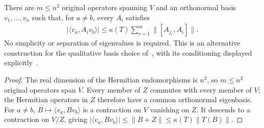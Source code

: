 \begin{lemma}
    \label{thm:hastings05_constructed_ground_basis}
    \leanok
    There are $m\le n^2$ original operators spanning $V$ and an orthonormal
    basis $v_1,\dots,v_n$ such that, for $a\ne b$, every $A_i$ satisfies
    \begin{align*}
        |\langle v_a,A_iv_b\rangle|
        \le\kappa(T)\sum_{r=1}^m\|[A_{j_r},A_i]\|.
    \end{align*}
    No simplicity or separation of eigenvalues is required. This is an
    alternative construction for the qualitative basis choice
    of~\cite[lines 1695--1708]{Hastings2006Solving}, with its conditioning
    displayed explicitly~\cite{gap:hastings05_two_dim_ground_basis}.
\end{lemma}
\begin{proof}\leanok
    The real dimension of the Hermitian endomorphisms is $n^2$, so $m\le n^2$
    original operators span $V$. Every member of $Z$ commutes with every member
    of $V$; the Hermitian operators in $Z$ therefore have a common orthonormal
    eigenbasis. For $a\ne b$, $B\mapsto\langle v_a,Bv_b\rangle$ is a contraction
    on $V$ vanishing on $Z$. It descends to a contraction on $V/Z$, giving
    $|\langle v_a,Bv_b\rangle|\le\|B+Z\|\le\kappa(T)\|T(B)\|$.
\end{proof}


